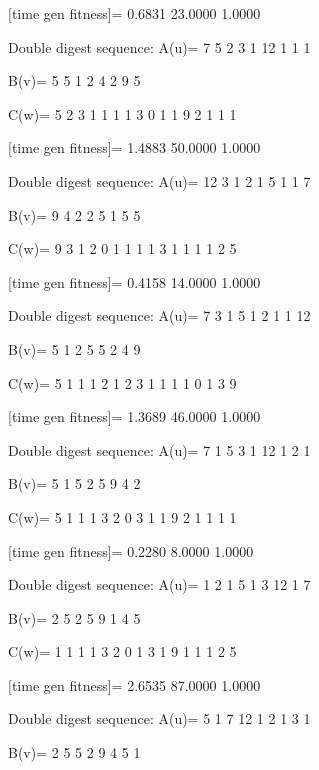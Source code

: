 [time gen fitness]=
    0.6831   23.0000    1.0000

Double digest sequence:
A(u)=
     7     5     2     3     1    12     1     1     1

B(v)=
     5     5     1     2     4     2     9     5

C(w)=
     5     2     3     1     1     1     1     3     0     1     1     9     2     1     1     1

[time gen fitness]=
    1.4883   50.0000    1.0000

Double digest sequence:
A(u)=
    12     3     1     2     1     5     1     1     7

B(v)=
     9     4     2     2     5     1     5     5

C(w)=
     9     3     1     2     0     1     1     1     1     3     1     1     1     1     2     5

[time gen fitness]=
    0.4158   14.0000    1.0000

Double digest sequence:
A(u)=
     7     3     1     5     1     2     1     1    12

B(v)=
     5     1     2     5     5     2     4     9

C(w)=
     5     1     1     1     2     1     2     3     1     1     1     1     0     1     3     9

[time gen fitness]=
    1.3689   46.0000    1.0000

Double digest sequence:
A(u)=
     7     1     5     3     1    12     1     2     1

B(v)=
     5     1     5     2     5     9     4     2

C(w)=
     5     1     1     1     3     2     0     3     1     1     9     2     1     1     1     1

[time gen fitness]=
    0.2280    8.0000    1.0000

Double digest sequence:
A(u)=
     1     2     1     5     1     3    12     1     7

B(v)=
     2     5     2     5     9     1     4     5

C(w)=
     1     1     1     1     3     2     0     1     3     1     9     1     1     1     2     5

[time gen fitness]=
    2.6535   87.0000    1.0000

Double digest sequence:
A(u)=
     5     1     7    12     1     2     1     3     1

B(v)=
     2     5     5     2     9     4     5     1

